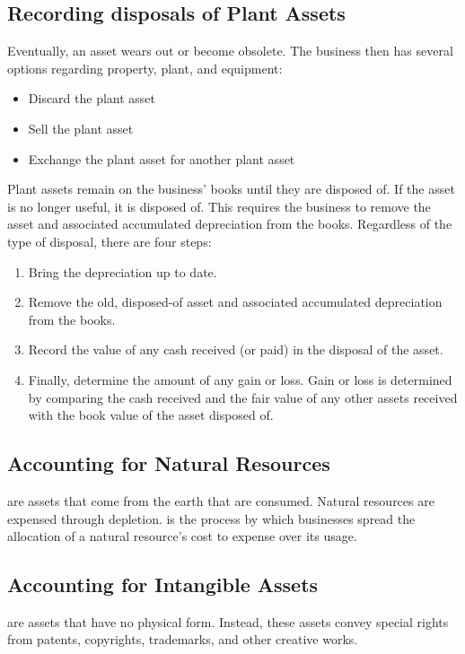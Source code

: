 \documentclass{article}
\begin{document}
\subsection{Recording disposals of Plant Assets}

Eventually, an asset wears out or become obsolete. The business then has several options regarding property, plant, and equipment: 
\begin{itemize}
  \item Discard the plant asset 
  \item Sell the plant asset 
  \item Exchange the plant asset for another plant asset
\end{itemize}
Plant assets remain on the business' books until they are disposed of. If the asset is no longer useful, it is disposed of. This requires the business to remove the asset and associated accumulated depreciation from the books. Regardless of the type of disposal, there are four steps: 
\begin{enumerate}
  \item Bring the depreciation up to date. 
  \item Remove the old, disposed-of asset and associated accumulated depreciation from the books. 
  \item Record the value of any cash received (or paid) in the disposal of the asset. 
  \item Finally, determine the amount of any gain or loss. Gain or loss is determined by comparing the cash received and the fair value of any other assets received with the book value of the asset disposed of. 
\end{enumerate}

\subsection{Accounting for Natural Resources}

 are assets that come from the earth that are consumed. Natural resources are expensed through depletion.  is the process by which businesses spread the allocation of a natural resource's cost to expense over its usage. 

\subsection{Accounting for Intangible Assets}

 are assets that have no physical form. Instead, these assets convey special rights from patents, copyrights, trademarks, and other creative works. \\ 
\end{document}
